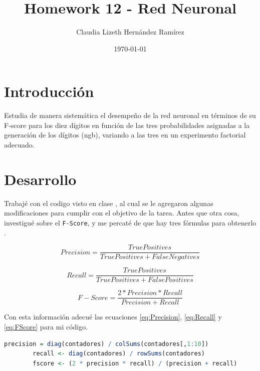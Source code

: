 \documentclass{article}
\author{Claudia Lizeth Hern\'andez Ram\'irez} %
\title{Homework 12 - Red Neuronal} %
\date{\today}
\begin{document}

\maketitle %



\section{Introducci\'{o}n}\label{intro} %
Estudia de manera sistem\'atica el desempeño de la red neuronal en t\'erminos de su F-score para los diez d\'igitos en funci\'on de las tres probabilidades asignadas a la generaci\'on de los d\'igitos (ngb), variando a las tres en un experimento factorial adecuado.


\section{Desarrollo}\label{desarrollo} %
Trabaj\'e con el codigo visto en clase \citep{CBase}, al cual se le agregaron algunas modificaciones para cumplir con el objetivo de la tarea. Antes que otra cosa, investigu\'e sobre el \texttt{F-Score}, y me percat\'e de que hay tres f\'ormulas para obtenerlo \citep{FScore1} \citep{FScore2}.

\begin{equation}
\label{eq:Precision}
Precision = \dfrac {True Positives}{True Positives + False Negatives}
\end{equation}

\begin{equation}
\label{eq:Recall}
Recall = \dfrac {True Positives}{True Positives + False Positives}
\end{equation}

\begin{equation}
\label{eq:FScore}
F-Score = \dfrac {2 * Precision * Recall}{Precision + Recall}
\end{equation}

Con esta informaci\'on adecu\'e las ecuaciones \ref{eq:Precision}, \ref{eq:Recall} y \ref{eq:FScore} para mi c\'odigo.


\begin{lstlisting}[language=R, caption= Segmento de c\'odigo ecuaci\'on F-Score.]
    precision = diag(contadores) / colSums(contadores[,1:10])
        recall <- diag(contadores) / rowSums(contadores)
        fscore <- (2 * precision * recall) / (precision + recall)
\end{lstlisting}
\end{document}

